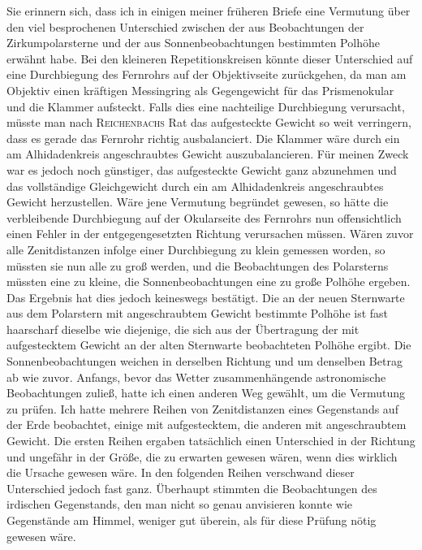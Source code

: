 \par\indent Sie erinnern sich, dass ich in einigen meiner früheren Briefe eine Vermutung über den viel besprochenen Unterschied zwischen der aus Beobachtungen der Zirkumpolarsterne und der aus Sonnenbeobachtungen bestimmten Polhöhe erwähnt habe. Bei den kleineren Repetitionskreisen könnte dieser Unterschied auf eine Durchbiegung des Fernrohrs auf der Objektivseite zurückgehen, da man am Objektiv einen kräftigen Messingring als Gegengewicht für das Prismenokular und die Klammer aufsteckt. Falls dies eine nachteilige Durchbiegung verursacht, müsste man nach \textsc{Reichenbachs} Rat das aufgesteckte Gewicht so weit verringern, dass es gerade das Fernrohr richtig ausbalanciert. Die Klammer wäre durch ein am Alhidadenkreis angeschraubtes Gewicht auszubalancieren. Für meinen Zweck war es jedoch noch günstiger, das aufgesteckte Gewicht ganz abzunehmen und das vollständige Gleichgewicht durch ein am Alhidadenkreis angeschraubtes Gewicht herzustellen. Wäre jene Vermutung begründet gewesen, so hätte die verbleibende Durchbiegung auf der Okularseite des Fernrohrs nun offensichtlich einen Fehler in der entgegengesetzten Richtung verursachen müssen. Wären zuvor alle Zenitdistanzen infolge einer Durchbiegung zu klein gemessen worden, so müssten sie nun alle zu groß werden, und die Beobachtungen des Polarsterns müssten eine zu kleine, die Sonnenbeobachtungen eine zu große Polhöhe ergeben. Das Ergebnis hat dies jedoch keineswegs bestätigt. Die an der neuen Sternwarte aus dem Polarstern mit angeschraubtem Gewicht bestimmte Polhöhe ist fast haarscharf dieselbe wie diejenige, die sich aus der Übertragung der mit aufgestecktem Gewicht an der alten Sternwarte beobachteten Polhöhe ergibt. Die Sonnenbeobachtungen weichen in derselben Richtung und um denselben Betrag ab wie zuvor. Anfangs, bevor das Wetter zusammenhängende astronomische Beobachtungen zuließ, hatte ich einen anderen Weg gewählt, um die Vermutung zu prüfen. Ich hatte mehrere Reihen von Zenitdistanzen eines Gegenstands auf der Erde beobachtet, einige mit aufgestecktem, die anderen mit angeschraubtem Gewicht. Die ersten Reihen ergaben tatsächlich einen Unterschied in der Richtung und ungefähr in der Größe, die zu erwarten gewesen wären, wenn dies wirklich die Ursache gewesen wäre. In den folgenden Reihen verschwand dieser Unterschied jedoch fast ganz. Überhaupt stimmten die Beobachtungen des irdischen Gegenstands, den man nicht so genau anvisieren konnte wie Gegenstände am Himmel, weniger gut überein, als für diese Prüfung nötig gewesen wäre.

